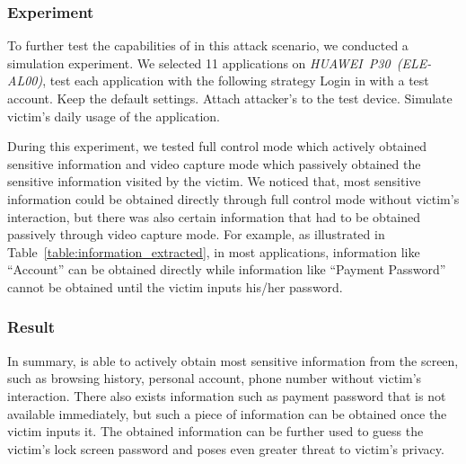 
\subsubsection{Experiment}

To further test the capabilities of \tool in this attack scenario, we conducted a simulation experiment.
We selected 11 applications on \mbox{\textit{HUAWEI P30 (ELE-AL00)}}, test each application with the following strategy
 Login in with a test account.
 Keep the default settings.
 Attach attacker's \tool to the test device.
 Simulate victim's daily usage of the application.

During this experiment, we tested full control mode which actively obtained sensitive information and video capture mode which passively obtained the sensitive information visited by the victim. We noticed that, most sensitive information could be obtained directly through full control mode without victim's interaction, but there was also certain information that had to be obtained passively through video capture mode. For example, as illustrated in Table~\ref{table:information_extracted}, in most applications, information like ``Account'' can be obtained directly while information like ``Payment Password'' cannot be obtained until the victim inputs his/her password.

\subsubsection{Result}
In summary, \tool is able to actively obtain most sensitive information from the screen, such as browsing history, personal account, phone number without victim's interaction. There also exists information such as payment password that is not available immediately, but such a piece of information can be obtained once the victim inputs it. The obtained information can be further used to guess the victim's lock screen password and poses even greater threat to victim's privacy.


